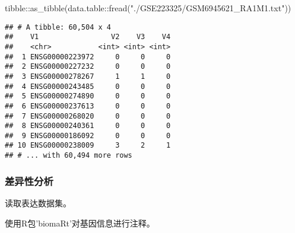 \documentclass[
]{article}
\newenvironment{Shaded}{\begin{snugshade}}{\end{snugshade}}
\newcommand{\AttributeTok}[1]{\textcolor[rgb]{0.77,0.63,0.00}{#1}}
\newcommand{\DecValTok}[1]{\textcolor[rgb]{0.00,0.00,0.81}{#1}}
\newcommand{\FunctionTok}[1]{\textcolor[rgb]{0.00,0.00,0.00}{#1}}
\newcommand{\NormalTok}[1]{#1}
\newcommand{\OtherTok}[1]{\textcolor[rgb]{0.56,0.35,0.01}{#1}}
\newcommand{\SpecialCharTok}[1]{\textcolor[rgb]{0.00,0.00,0.00}{#1}}
\newcommand{\StringTok}[1]{\textcolor[rgb]{0.31,0.60,0.02}{#1}}
\begin{document}
\begin{Shaded}
\begin{Highlighting}[]
\NormalTok{tibble}\SpecialCharTok{::}\FunctionTok{as\_tibble}\NormalTok{(data.table}\SpecialCharTok{::}\FunctionTok{fread}\NormalTok{(}\StringTok{"./GSE223325/GSM6945621\_RA1M1.txt"}\NormalTok{))}
\end{Highlighting}
\end{Shaded}

\begin{verbatim}
## # A tibble: 60,504 x 4
##    V1                 V2    V3    V4
##    <chr>           <int> <int> <int>
##  1 ENSG00000223972     0     0     0
##  2 ENSG00000227232     0     0     0
##  3 ENSG00000278267     1     1     0
##  4 ENSG00000243485     0     0     0
##  5 ENSG00000274890     0     0     0
##  6 ENSG00000237613     0     0     0
##  7 ENSG00000268020     0     0     0
##  8 ENSG00000240361     0     0     0
##  9 ENSG00000186092     0     0     0
## 10 ENSG00000238009     3     2     1
## # ... with 60,494 more rows
\end{verbatim}

\hypertarget{diff}{%
\subsubsection{差异性分析}\label{diff}}

读取表达数据集。

\begin{Shaded}
\end{Shaded}

使用R包'biomaRt'对基因信息进行注释。
\end{document}
